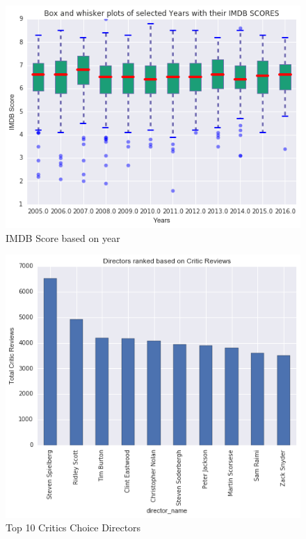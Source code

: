 \documentclass{article}%
\begin{document}
\begin{figure}
\centering
\includegraphics[width=1.0\columnwidth]{Fig/BoxandwhiskerplotofYearsbasedonimdbscore.png}
\caption{IMDB Score based on year}
\label{fig:Box and whisker plotofYearsbasedonimdbscore}
\end{figure}

\begin{figure}
\centering
\includegraphics[width=1.0\columnwidth]{Fig/DirectorsRankedontotalcriticreviews.png}
\caption{Top 10 Critics Choice Directors}
\label{fig:Directors Ranked on total critic reviews}
\end{figure}
\end{document}
